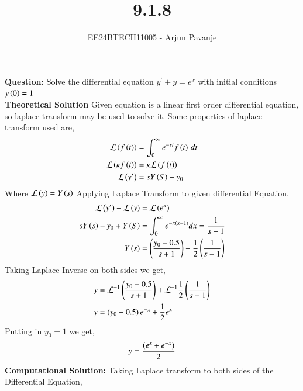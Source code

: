 \documentclass[journal]{IEEEtran}
\begin{document}

\vspace{3cm}

\title{9.1.8}
\author{EE24BTECH11005 - Arjun Pavanje}
{\let\newpage\relax\maketitle}
\textbf{Question:}
Solve the differential equation $y^{\prime}+y=e^x$ with initial conditions $y\left(0\right)=1$
\solution\\

\textbf{Theoretical Solution}\newline
Given equation is a linear first order differential equation, so laplace transform may be used to solve it. Some properties of laplace transform used are,
\begin{align}
  \mathcal{L}\left(f\left(t\right)\right) &= \int_0^{\infty} e^{-st} f\left(t\right) \, dt\\
 \mathcal{L}\left(\kappa f\left(t\right)\right) &= \kappa \mathcal{L}\left(f\left(t\right)\right)\\
  \mathcal{L}\left(y^{\prime}\right) &= sY\left(S\right) - y_0
\end{align}
Where $\mathcal{L}\left(y\right) = Y\left(s\right)$
Applying Laplace Transform to given differential Equation,
\begin{align}
  \mathcal{L}\left(y^{\prime}\right) + \mathcal{L}\left(y\right) &= \mathcal{L}\left(e^{x}\right)\\
  sY\left(s\right) - y_0 + Y\left(S\right) &= \int_0^{\infty} e^{-x\left(x - 1\right) } dx = \frac{1}{s-1}\\
  Y\left(s\right) &= \left(\frac{y_0 - 0.5}{s+1}\right) + \frac{1}{2}\left(\frac{1}{s-1}\right)
 \end{align}
 Taking Laplace Inverse on both sides we get,
 \begin{align}
   y &= \mathcal{L}^{-1}\left(\frac{y_0 - 0.5}{s+1}\right) + \mathcal{L}^{-1}\frac{1}{2}\left(\frac{1}{s-1}\right)\\
   y &= \left(y_0 - 0.5\right)e^{-x} + \frac{1}{2} e^{x}
 \end{align}
 Putting in $y_0 = 1$ we get,
 \begin{align}
   y = \frac{\left(e^{x} + e^{-x}\right)}{2}
 \end{align}\textbf{Computational Solution:}\newline
Taking Laplace transform to both sides of the Differential Equation,
\end{document}
